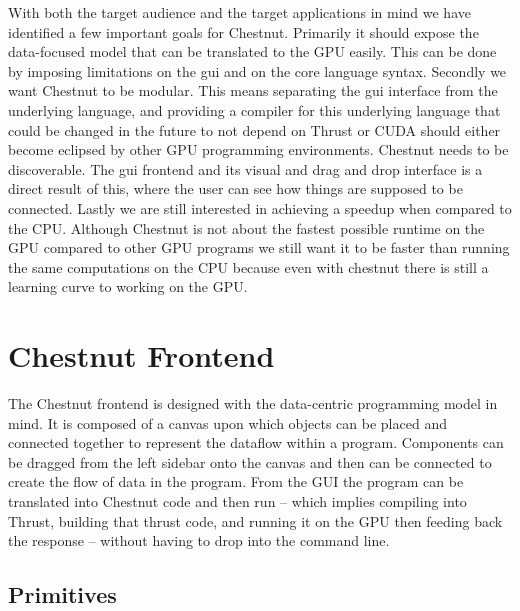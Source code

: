 \documentclass[twocolumn]{article}
\renewcommand{\|}{\origbar} %
\begin{document}
With both the target audience and the target applications in mind we have identified a few important goals for Chestnut. Primarily it should expose the data-focused model that can be translated to the GPU easily. This can be done by imposing limitations on the gui and on the core language syntax. Secondly we want Chestnut to be modular. This means separating the gui interface from the underlying language, and providing a compiler for this underlying language that could be changed in the future to not depend on Thrust or CUDA should either become eclipsed by other GPU programming environments. Chestnut needs to be discoverable. The gui frontend and its visual and drag and drop interface is a direct result of this, where the user can see how things are supposed to be connected. Lastly we are still interested in achieving a speedup when compared to the CPU. Although Chestnut is not about the fastest possible runtime on the GPU compared to other GPU programs we still want it to be faster than running the same computations on the CPU because even with chestnut there is still a learning curve to working on the GPU.

\section{Chestnut Frontend}
\label{sec:chestnutFrontend}

The Chestnut frontend is designed with the data-centric programming model in mind. It is composed of a canvas upon which objects can be placed and connected together to represent the dataflow within a program. Components can be dragged from the left sidebar onto the canvas and then can be connected to create the flow of data in the program. From the GUI the program can be translated into Chestnut code and then run -- which implies compiling into Thrust, building that thrust code, and running it on the GPU then feeding back the response -- without having to drop into the command line.

\subsection{Primitives}
\end{document}
